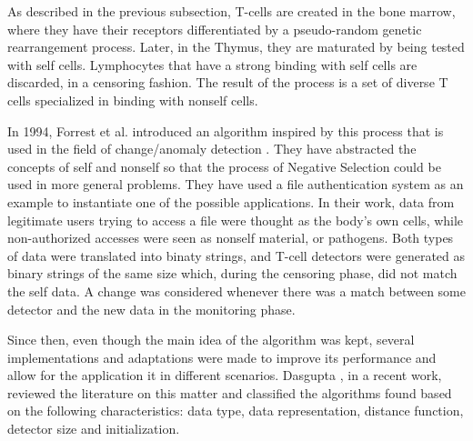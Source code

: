 As described in the previous subsection, T-cells are created in the bone marrow, where they have their receptors differentiated by a pseudo-random genetic rearrangement process. Later, in the Thymus, they are maturated by being tested with self cells. Lymphocytes that have a strong binding with self cells are discarded, in a censoring fashion. The result of the process is a set of diverse T cells specialized in binding with nonself cells.

In 1994, Forrest et al. introduced an algorithm inspired by this process that is used in the field of change/anomaly detection \cite{Forrest1994}. They have abstracted the concepts of self and nonself so that the process of Negative Selection could be used in more general problems. They have used a file authentication system as an example to instantiate one of the possible applications. In their work, data from legitimate users trying to access a file were thought as the body's own cells, while non-authorized accesses were seen as nonself material, or pathogens. Both types of data were translated into binaty strings, and T-cell detectors were generated as binary strings of the same size which, during the censoring phase, did not match the self data. A change was considered whenever there was a match between some detector and the new data in the monitoring phase.

Since then, even though the main idea of the algorithm was kept, several implementations and adaptations were made to improve its performance and allow for the application it in different scenarios. Dasgupta \cite{NSAResearch2021}, in a recent work, reviewed the literature on this matter and classified the algorithms found based on the following characteristics: data type, data representation, distance function, detector size and initialization.


